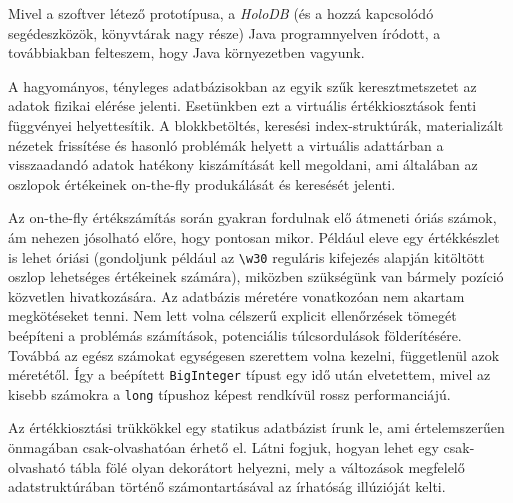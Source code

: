 \documentclass[
    parspace,
    noindent,
    nohyp,
]{elteiktdk}[2023/04/10]
\begin{document}
Mivel a szoftver létező prototípusa, a \textit{HoloDB}
(és a hozzá kapcsolódó segédeszközök, könyvtárak nagy része) Java programnyelven íródott,
a továbbiakban felteszem, hogy Java környezetben vagyunk.

A hagyományos, tényleges adatbázisokban az egyik szűk keresztmetszetet
az adatok fizikai elérése jelenti.
Esetünkben ezt a virtuális értékkiosztások fenti függvényei helyettesítik.
A blokkbetöltés, keresési index-struktúrák, materializált nézetek frissítése
és hasonló problémák helyett a virtuális adattárban
a visszaadandó adatok hatékony kiszámítását kell megoldani,
ami általában az oszlopok értékeinek on-the-fly produkálását és keresését jelenti.

Az on-the-fly értékszámítás során gyakran fordulnak elő átmeneti óriás számok,
ám nehezen jósolható előre, hogy pontosan mikor.
Például eleve egy értékkészlet is lehet óriási
(gondoljunk például az \texttt{{\textbackslash}w{30}}
reguláris kifejezés alapján kitöltött oszlop lehetséges értékeinek számára),
miközben szükségünk van bármely pozíció közvetlen hivatkozására.
Az adatbázis méretére vonatkozóan nem akartam megkötéseket tenni.
Nem lett volna célszerű explicit ellenőrzések tömegét beépíteni
a problémás számítások, potenciális túlcsordulások földerítésére.
Továbbá az egész számokat egységesen szerettem volna kezelni, függetlenül azok méretétől.
Így a beépített \texttt{BigInteger} típust egy idő után elvetettem,
mivel az kisebb számokra a \texttt{long} típushoz képest rendkívül rossz performanciájú.







Az értékkiosztási trükkökkel egy statikus adatbázist írunk le,
ami értelemszerűen önmagában csak-olvashatóan érhető el.
Látni fogjuk, hogyan lehet egy csak-olvasható tábla fölé olyan dekorátort helyezni,
mely a változások megfelelő adatstruktúrában történő számontartásával
az írhatóság illúzióját kelti.
\end{document}
